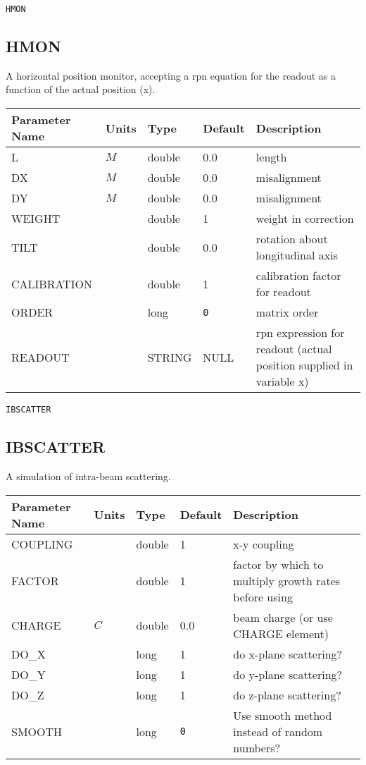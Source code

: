 \begin{latexonly}
\newpage
\begin{center}{\Large\verb|HMON|}\end{center}
\end{latexonly}\subsection{HMON}
A horizontal position monitor, accepting a rpn equation for the readout as a
function of the actual position (x).
\\
\begin{tabular}{|l|l|l|l|p{\descwidth}|} \hline
Parameter Name & Units & Type & Default & Description \\ \hline 
L & $M$ & double &  0.0 & length  \\ \hline 
DX & $M$ & double &  0.0 & misalignment  \\ \hline 
DY & $M$ & double &  0.0 & misalignment  \\ \hline 
WEIGHT &  & double &   1 & weight in correction  \\ \hline 
TILT &  & double &  0.0 & rotation about longitudinal axis  \\ \hline 
CALIBRATION &  & double &   1 & calibration factor for readout  \\ \hline 
ORDER &  & long &  \verb|0| & matrix order  \\ \hline 
READOUT &  & STRING &   NULL            & rpn expression for readout (actual position supplied in variable x)  \\ \hline 
\end{tabular}

\begin{latexonly}
\newpage
\begin{center}{\Large\verb|IBSCATTER|}\end{center}
\end{latexonly}\subsection{IBSCATTER}
A simulation of intra-beam scattering.
\\
\begin{tabular}{|l|l|l|l|p{\descwidth}|} \hline
Parameter Name & Units & Type & Default & Description \\ \hline 
COUPLING &  & double &   1 & x-y coupling  \\ \hline 
FACTOR &  & double &   1 & factor by which to multiply growth rates before using  \\ \hline 
CHARGE & $C$ & double &  0.0 & beam charge (or use CHARGE element)  \\ \hline 
DO\_X &  & long &   1               & do x-plane scattering?  \\ \hline 
DO\_Y &  & long &   1               & do y-plane scattering?  \\ \hline 
DO\_Z &  & long &   1               & do z-plane scattering?  \\ \hline 
SMOOTH &  & long &  \verb|0| & Use smooth method instead of random numbers?  \\ \hline 
\end{tabular}

